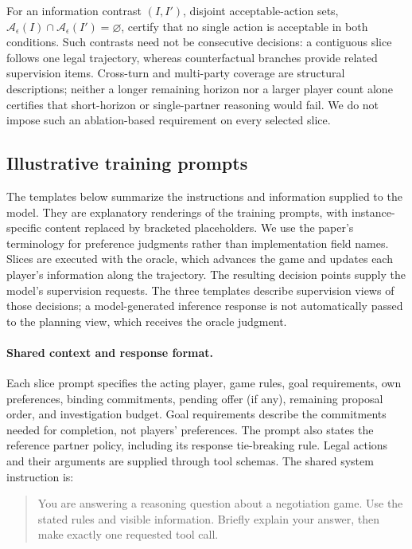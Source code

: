 For an information contrast $(I,I')$, disjoint acceptable-action sets,
$\mathcal A_\epsilon(I)\cap\mathcal A_\epsilon(I')=\varnothing$, certify
that no single action is acceptable in both conditions. Such contrasts need
not be consecutive decisions: a contiguous slice follows one legal
trajectory, whereas counterfactual branches provide related supervision
items. Cross-turn and multi-party coverage are structural descriptions;
neither a longer remaining horizon nor a larger player count alone certifies
that short-horizon or single-partner reasoning would fail. We do not impose
such an ablation-based requirement on every selected slice.

\subsection{Illustrative training prompts}
\label{app:training-prompts}

The templates below summarize the instructions and information supplied to
the model. They are explanatory renderings of the training prompts, with
instance-specific content replaced by bracketed placeholders. We use the
paper's terminology for preference judgments rather than implementation
field names. Slices are executed with the oracle, which advances the game
and updates each player's information along the trajectory. The resulting
decision points supply the model's supervision requests. The three templates
describe supervision views of those decisions; a model-generated inference
response is not automatically passed to the planning view, which receives
the oracle judgment.

\paragraph{Shared context and response format.}
Each slice prompt specifies the acting player, game rules, goal requirements,
own preferences, binding commitments, pending offer (if any), remaining
proposal order, and investigation budget. Goal requirements describe the
commitments needed for completion, not players' preferences. The prompt
also states the reference partner policy, including its response tie-breaking
rule. Legal actions and their arguments are supplied through tool schemas.
The shared system instruction is:
\begin{quote}\small
You are answering a reasoning question about a negotiation game. Use the
stated rules and visible information. Briefly explain your answer, then
make exactly one requested tool call.
\end{quote}

